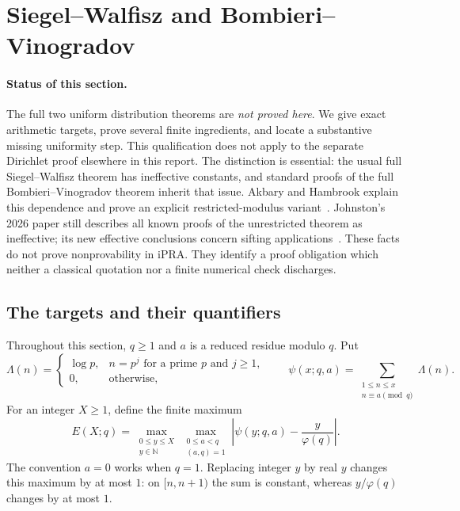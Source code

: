 \section{Siegel--Walfisz and Bombieri--Vinogradov}
\label{sec:swbv}

\paragraph{Status of this section.}
The full two uniform distribution theorems are \emph{not proved here}.
We give exact arithmetic targets, prove several finite ingredients, and
locate a substantive missing uniformity step. This qualification does not
apply to the separate Dirichlet proof elsewhere in this report.
The distinction is essential: the usual full Siegel--Walfisz theorem has
ineffective constants, and standard proofs of the full
Bombieri--Vinogradov theorem inherit that issue. Akbary and Hambrook
explain this dependence and prove an explicit restricted-modulus
variant~\cite{AkbaryHambrook}. Johnston's 2026 paper still describes all
known proofs of the unrestricted theorem as ineffective; its new
effective conclusions concern sifting applications~\cite{Johnston2026}.
These facts do not prove nonprovability in iPRA. They identify a proof
obligation which neither a classical quotation nor a finite numerical
check discharges.

\subsection{The targets and their quantifiers}

Throughout this section, $q\geq1$ and $a$ is a reduced residue modulo $q$.
Put
\[
 \Lambda(n)=
 \begin{cases}
  \log p,&n=p^j\text{ for a prime }p\text{ and }j\geq1,\\
  0,&\text{otherwise},
 \end{cases}
 \qquad
 \psi(x;q,a)=\sum_{\substack{1\leq n\leq x\\n\equiv a\pmod q}}\Lambda(n).
\]
For an integer $X\geq1$, define the finite maximum
\[
 E(X;q)=
 \max_{\substack{0\leq y\leq X\\y\in\mathbb N}}
 \max_{\substack{0\leq a<q\\(a,q)=1}}
 \left|\psi(y;q,a)-\frac{y}{\varphi(q)}\right|.
\]
The convention $a=0$ works when $q=1$. Replacing integer $y$ by real
$y$ changes this maximum by at most $1$: on $[n,n+1)$ the sum is constant,
whereas $y/\varphi(q)$ changes by at most $1$.

